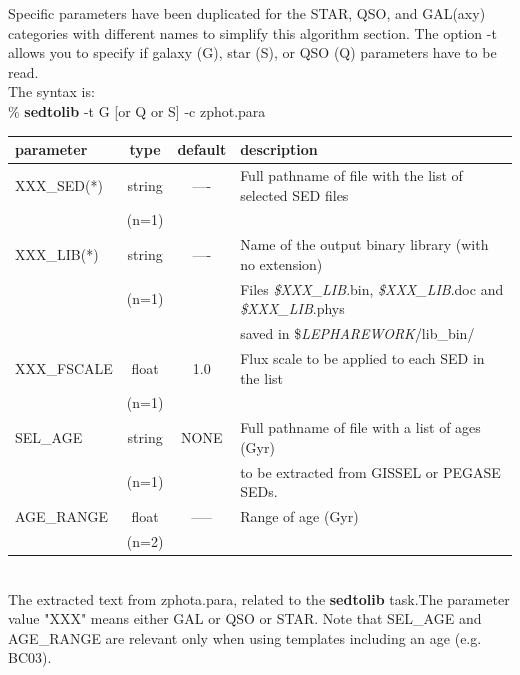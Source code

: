 \documentclass[12pt]{article}
\begin{document}
 Specific parameters have been duplicated for 
 the STAR, QSO, and GAL(axy) categories with different names to simplify this algorithm section. The option -t allows you to specify 
 if galaxy (G), star (S), or QSO (Q) parameters have to be read.  \\
%
The syntax is: \\

$\%$ {\bf sedtolib} -t G [or Q or S]  -c zphot.para \\

 
\begin{tabular}{lccl}
\hline
 parameter     & type    & default &  description \\
\hline
 XXX\_SED(*)    & string  & ---- & Full pathname of file with the list of selected SED files  \\
                         & (n=1)   &      &                                               \\
%
 XXX\_LIB(*)    & string  & ---- & Name of the output binary library (with no extension) \\
                        & (n=1)   &      & Files {\it \$XXX\_LIB}.bin, {\it  \$XXX\_LIB}.doc and 
                                                  {\it  \$XXX\_LIB}.phys      \\
                        &             &      & saved in   \${\it LEPHAREWORK}/lib\_bin/       \\
%
 XXX\_FSCALE  & float   & 1.0  & Flux scale to be applied to each SED in the list \\
              & (n=1)   &      &                                                  \\
%
 SEL\_AGE   & string  & NONE &  Full pathname of file with a list of ages (Gyr)  \\
                     &  (n=1)  &            &   to be extracted from GISSEL or PEGASE SEDs. \\
%
AGE\_RANGE& float  &  ----- &  Range of age (Gyr)   \\

                      & (n=2) &        &            \\


\hline
\end{tabular}\\

The extracted text from zphota.para, related to the {\bf sedtolib} task.The parameter value "XXX" means either GAL or QSO or STAR. Note that SEL\_AGE and AGE\_RANGE are relevant only when using templates including an age (e.g. BC03). \\
\end{document}
